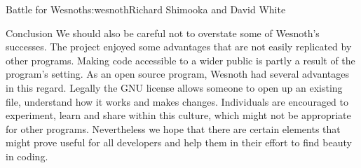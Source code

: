 \begin{aosachapter}{Battle for Wesnoth}{s:wesnoth}{Richard Shimooka and David White}
\begin{aosasect1}{Conclusion}
We should also be careful not to overstate some of Wesnoth's
successes.  The project enjoyed some advantages that are not easily
replicated by other programs. Making code accessible to a wider public
is partly a result of the program's setting. As an open source
program, Wesnoth had several advantages in this regard. Legally the
GNU license allows someone to open up an existing file, understand how
it works and makes changes.  Individuals are encouraged to experiment,
learn and share within this culture, which might not be appropriate
for other programs. Nevertheless we hope that there are certain
elements that might prove useful for all developers and help them in
their effort to find beauty in coding.

\end{aosasect1}

\end{aosachapter}
